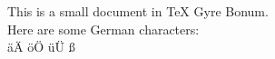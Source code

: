 \documentclass{article}
\begin{document}
This is a small document in TeX Gyre Bonum.
\\
Here are some German characters:
\\
äÄ öÖ üÜ ß
\end{document}
